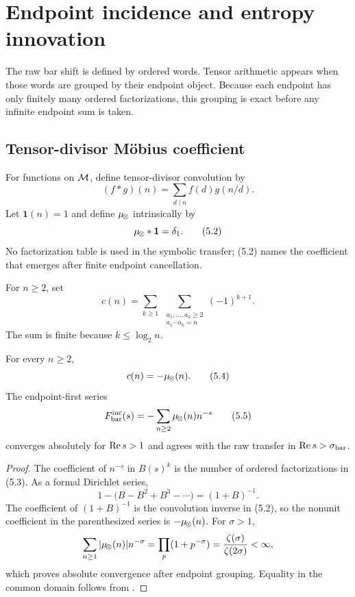 \section{Endpoint incidence and entropy innovation}
\label{sec:incidence}

The raw bar shift is defined by ordered words.  Tensor arithmetic appears
when those words are grouped by their endpoint object.  Because each endpoint
has only finitely many ordered factorizations, this grouping is exact before
any infinite endpoint sum is taken.

\subsection{Tensor-divisor M\"obius coefficient}

For functions on $\mathcal M$, define tensor-divisor convolution by
\[
  (f*g)(n)=\sum_{d\mid n}f(d)g(n/d).
  \tag{5.1}
\]
Let $\mathbf1(n)=1$ and define $\mu_{\!\otimes}$ intrinsically by
\[
  \mu_{\!\otimes}*\mathbf1=\delta_1.
  \tag{5.2}
\]
No factorization table is used in the symbolic transfer; (5.2) names the
coefficient that emerges after finite endpoint cancellation.

For $n\ge2$, set
\[
  c(n)=\sum_{k\ge1}\ \sum_{\substack{a_1,\ldots,a_k\ge2\\
                         a_1\cdots a_k=n}}
       (-1)^{k+1}.
  \tag{5.3}
\]
The sum is finite because $k\le\log_2n$.

\begin{theorem}
\label{thm:endpoint}
For every $n\ge2$,
\[
  c(n)=-\mu_{\!\otimes}(n).
  \tag{5.4}
\]
The endpoint-first series
\[
  F_{\rm bar}^{\mathrm{inc}}(s)
  =-\sum_{n\ge2}\mu_{\!\otimes}(n)n^{-s}
  \tag{5.5}
\]
converges absolutely for $\operatorname{Re} s>1$ and agrees with the raw transfer in
$\operatorname{Re} s>\sigma_{\rm bar}$.
\end{theorem}

\begin{proof}
The coefficient of $n^{-s}$ in $B(s)^k$ is the number of ordered
factorizations in (5.3).  As a formal Dirichlet series,
\[
  1-\bigl(B-B^2+B^3-\cdots\bigr)=(1+B)^{-1}.
\]
The coefficient of $(1+B)^{-1}$ is the convolution inverse in (5.2), so the
nonunit coefficient in the parenthesized series is $-\mu_{\!\otimes}(n)$.  For
$\sigma>1$,
\[
  \sum_{n\ge1}|\mu_{\!\otimes}(n)|n^{-\sigma}
  =\prod_p(1+p^{-\sigma})
  =\frac{\zeta(\sigma)}{\zeta(2\sigma)}<\infty,
\]
which proves absolute convergence after endpoint grouping.  Equality in the
common domain follows from .
\end{proof}

